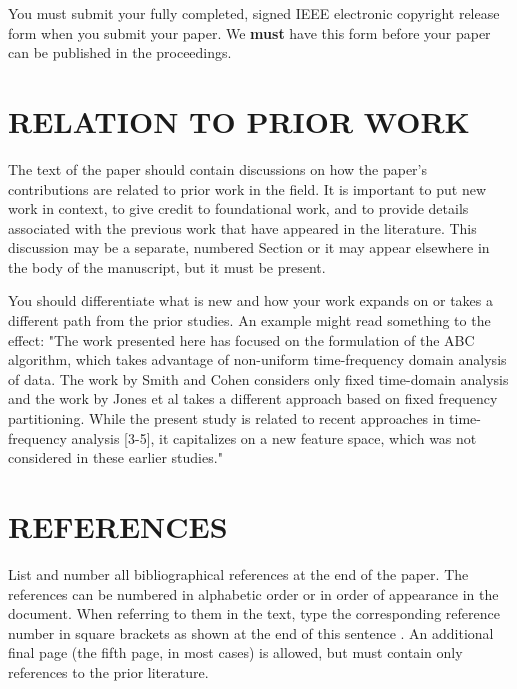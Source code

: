 \documentclass[letterpaper, 10 pt, twoside, conference]{ieeeconf}
\begin{document}
You must submit your fully completed, signed IEEE electronic copyright release
form when you submit your paper. We {\bf must} have this form before your paper
can be published in the proceedings.

\section{RELATION TO PRIOR WORK}
\label{sec:prior}

The text of the paper should contain discussions on how the paper's
contributions are related to prior work in the field. It is important
to put new work in  context, to give credit to foundational work, and
to provide details associated with the previous work that have appeared
in the literature. This discussion may be a separate, numbered Section
or it may appear elsewhere in the body of the manuscript, but it must
be present.

You should differentiate what is new and how your work expands on
or takes a different path from the prior studies. An example might
read something to the effect: "The work presented here has focused
on the formulation of the ABC algorithm, which takes advantage of
non-uniform time-frequency domain analysis of data. The work by
Smith and Cohen  considers only fixed time-domain analysis and
the work by Jones et al  takes a different approach based on
fixed frequency partitioning. While the present study is related
to recent approaches in time-frequency analysis [3-5], it capitalizes
on a new feature space, which was not considered in these earlier
studies."

\vfill\pagebreak

\section{REFERENCES}
\label{sec:refs}

List and number all bibliographical references at the end of the
paper. The references can be numbered in alphabetic order or in
order of appearance in the document. When referring to them in
the text, type the corresponding reference number in square
brackets as shown at the end of this sentence \cite{Chai1999}. An
additional final page (the fifth page, in most cases) is
allowed, but must contain only references to the prior
literature.



\end{document}
